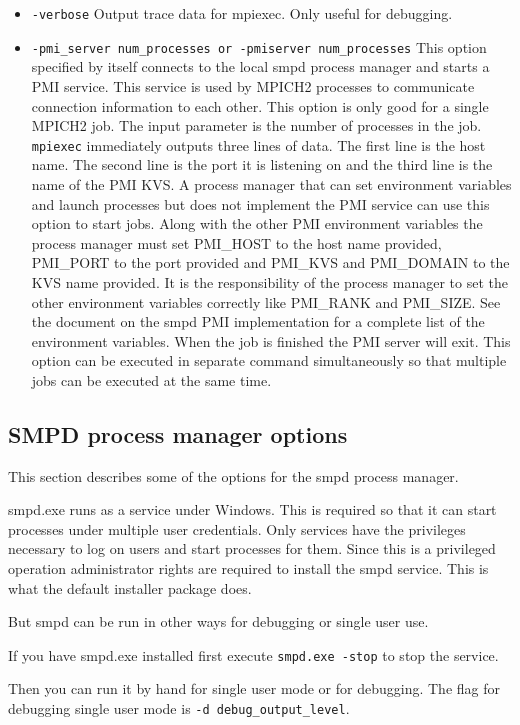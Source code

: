\documentclass[dvipdfm,11pt]{article}
\begin{document}
\begin{itemize}
\item \texttt{-verbose}
Output trace data for mpiexec.  Only useful for debugging.
\item \texttt{-pmi\_server num\_processes or -pmiserver num\_processes}
This option specified by itself connects to the local smpd process manager and
starts a PMI service.  This service is used by MPICH2 processes to communicate
connection information to each other.  This option is only good for a single
MPICH2 job.  The input parameter is the number of processes in the job.
\texttt{mpiexec} immediately outputs three lines of data.  The first line is the
host name.  The second line is the port it is listening on and the third line
is the name of the PMI KVS.  A process manager that can set environment variables
and launch processes but does not implement the PMI service can use this option
to start jobs.  Along with the other PMI environment variables the process 
manager must set PMI\_HOST to the host name provided, PMI\_PORT to the port
provided and PMI\_KVS and PMI\_DOMAIN to the KVS name provided.  It is the 
responsibility of the process manager to set the other environment variables
correctly like PMI\_RANK and PMI\_SIZE.  See the document on the smpd PMI implementation
for a complete list of the environment variables.  When the job is finished the
PMI server will exit.  This option can be executed in separate command simultaneously
so that multiple jobs can be executed at the same time.
\end{itemize}

\subsection{SMPD process manager options}
This section describes some of the options for the smpd process manager.

smpd.exe runs as a service under Windows.  This is required so that it can start
processes under multiple user credentials.  Only services have the privileges
necessary to log on users and start processes for them.  Since this is a privileged
operation administrator rights are required to install the smpd service.  This is
what the default installer package does.

But smpd can be run in other ways for debugging or single user use.

If you have smpd.exe installed first execute \texttt{smpd.exe -stop} to stop the
service.

Then you can run it by hand for single user mode or for debugging.  The flag for
debugging single user mode is \texttt{-d debug\_output\_level}.
\end{document}
